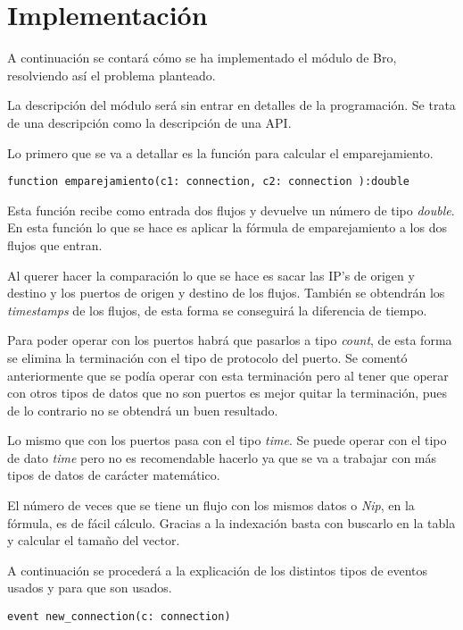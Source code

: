 \chapter{Implementación}

A continuación se contará cómo se ha implementado el módulo de Bro, resolviendo así el problema planteado.

\intro La descripción del módulo será sin entrar en detalles de la programación. Se trata de una descripción 
como la descripción de una API.

\intro Lo primero que se va a detallar es la función para calcular el emparejamiento.

\begin{lstlisting}[style=CodigoC]
function emparejamiento(c1: connection, c2: connection ):double 

\end{lstlisting}

\intro Esta función recibe como entrada dos flujos y devuelve un número de tipo \textit{double}. En esta función 
lo que se hace es aplicar la fórmula de emparejamiento a los dos flujos que entran.

\intro Al querer hacer la comparación lo que se hace es sacar las IP's de origen y destino y los puertos de 
origen y destino de los flujos. También se obtendrán los \textit{timestamps} de los flujos, de esta forma se 
conseguirá la diferencia de tiempo. 

\intro Para poder operar con los puertos habrá que pasarlos a tipo \textit{count}, de esta forma se elimina la 
terminación con el tipo de protocolo del puerto. Se comentó anteriormente que se podía operar con esta terminación 
pero al tener que operar con otros tipos de datos que no son puertos es mejor quitar la terminación, pues de lo 
contrario no se obtendrá un buen resultado. 

\intro Lo mismo que con los puertos pasa con el tipo \textit{time}. Se puede operar con el tipo de dato 
\textit{time} pero no es recomendable hacerlo ya que se va a trabajar con más tipos de datos de carácter 
matemático.

\intro El número de veces que se tiene un flujo con los mismos datos o \textit{Nip}, en la fórmula, es de fácil 
cálculo. Gracias a la indexación basta con buscarlo en la tabla y calcular el tamaño del vector. 

\intro A continuación se procederá a la explicación de los distintos tipos de eventos usados y para que son usados.

\begin{lstlisting}[style=CodigoC]
event new_connection(c: connection)

\end{lstlisting}

